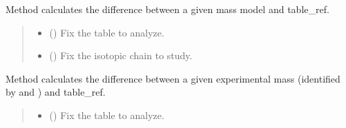 \documentclass[letterpaper,10pt,english]{sphinxmanual}
\begin{document}
\begin{fulllineitems}
\begin{fulllineitems}
\label{\detokenize{source/api/setup_nuc_be_theo:nucleardatapy.setup_nuc_be_theo.SetupNucBETheo.diff}}
\pysigstartsignatures
\pysiglinewithargsret
{}
{\sphinxparamcomma {}}
{}
\pysigstopsignatures
\sphinxAtStartPar
Method calculates the difference between a given mass
model and table\_ref.
\begin{quote}\begin{description}
\begin{itemize}
\item {} 
\sphinxAtStartPar
{} () \textendash{} Fix the table to analyze.

\item {} 
\sphinxAtStartPar
{} (\sphinxstyleliteralemphasis{\sphinxupquote{, }}) \textendash{} Fix the isotopic chain to study.

\end{itemize}

\end{description}\end{quote}

\sphinxAtStartPar
{}

\end{fulllineitems}


\begin{fulllineitems}
\label{\detokenize{source/api/setup_nuc_be_theo:nucleardatapy.setup_nuc_be_theo.SetupNucBETheo.diff_exp}}
\pysigstartsignatures
\pysiglinewithargsret
{}
{\sphinxparamcomma {}\sphinxparamcomma {}}
{}
\pysigstopsignatures
\sphinxAtStartPar
Method calculates the difference between a given experimental
mass (identified by  and ) and table\_ref.
\begin{quote}\begin{description}
\begin{itemize}
\item {} 
\sphinxAtStartPar
{} () \textendash{} Fix the table to analyze.


\end{itemize}
\end{description}
\end{quote}
\end{fulllineitems}
\end{fulllineitems}
\end{document}
